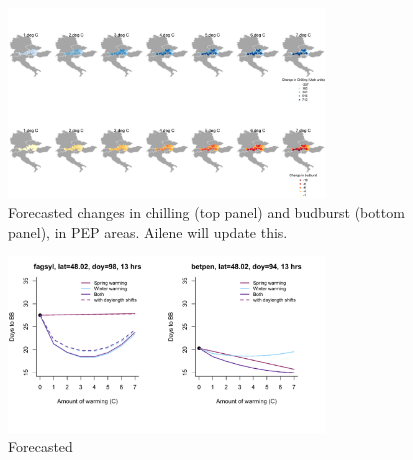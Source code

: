 \documentclass{article}
\begin{document}
\begin{figure}[h!]
\centering
\noindent \includegraphics[width=0.75\textwidth]{..//..//analyses/bb_analysis/figures/heatmap_betpen_forecastbbchill.pdf}
\caption{Forecasted changes in chilling (top panel) and budburst (bottom panel), in PEP areas. Ailene will update this. }
\label{fig:foremap}
\end{figure}
\begin{figure}[h!]
\centering
\noindent \includegraphics[width=0.75\textwidth]{..//..//analyses/bb_analysis/figures/forecasting/tempforecast_bothspp_PEPBB_wdl_utah.pdf}
\caption{Forecasted }
\label{fig:foremap}
\end{figure}
\end{document}
